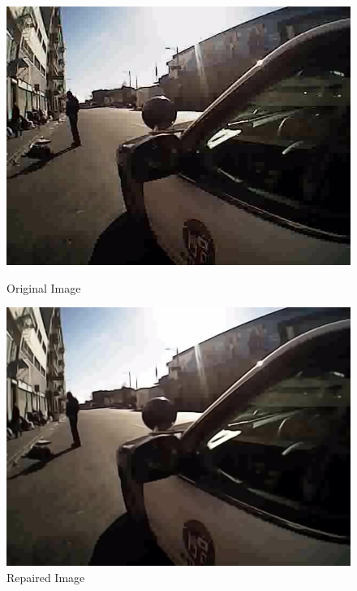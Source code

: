 \documentclass[a4paper]{article}
\begin{document}
\begin{figure}[H]
\begin{minipage}[b]{0.12\textwidth}
 \includegraphics[trim=0 7cm 21cm 6cm, clip, width=\textwidth]{original3.jpg}
 \caption{Original Image}
 \end{minipage}
  \begin{minipage}[b]{0.12\textwidth}
    \includegraphics[trim=0 7cm 21cm 6cm, clip, width=\textwidth]{original3Repaired.jpg}
    \caption{Repaired Image}
  \end{minipage}
    \hfill
  \begin{minipage}[b]{0.12\textwidth}

\end{minipage}
\end{figure}
\end{document}
